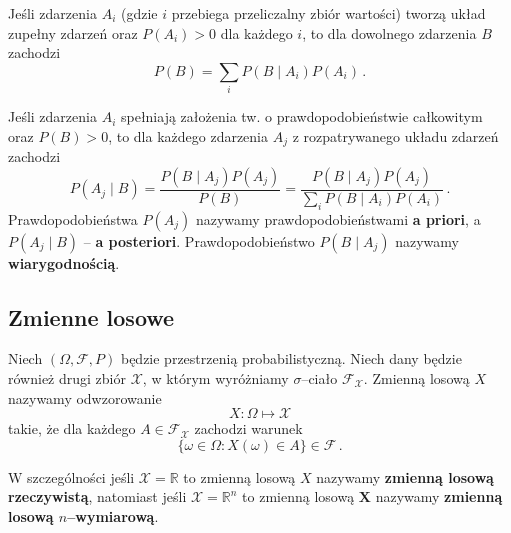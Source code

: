 \documentclass{myclass}
\numberwithin{equation}{section}
\begin{document}
\begin{theorem}
Jeśli zdarzenia \(A_i\) (gdzie \(i\) przebiega przeliczalny zbiór wartości) tworzą układ zupełny
zdarzeń oraz \(P(A_i) > 0\) dla każdego \(i\), to dla dowolnego zdarzenia \(B\) zachodzi
\begin{equation*}
    P(B) = \sum_{i} P(B \mid A_i) P(A_i)\,.
\end{equation*}
\end{theorem}

\begin{theorem}[Bayesa]
Jeśli zdarzenia \(A_i\) spełniają założenia tw. o prawdopodobieństwie całkowitym oraz \(P(B) > 0\),
to dla każdego zdarzenia \(A_j\) z rozpatrywanego układu zdarzeń zachodzi
\begin{equation*}
    P(A_j \mid B) = \frac{P(B \mid A_j) P(A_j)}{P(B)} = \frac{P(B \mid A_j) P(A_j)}{\sum_{i} P(B \mid A_i) P(A_i)}\,.
\end{equation*}
Prawdopodobieństwa \(P(A_j)\) nazywamy prawdopodobieństwami \textbf{a priori}, a \(P(A_j \mid
B)\) -- \textbf{a posteriori}. Prawdopodobieństwo \(P(B \mid A_j)\) nazywamy
\textbf{wiarygodnością}.   
\end{theorem}


\subsection{Zmienne losowe}

\begin{definition}
Niech \((\Omega, \mathcal{F}, P)\) będzie przestrzenią probabilistyczną. Niech dany będzie również
drugi zbiór \(\mathcal{X}\), w którym wyróżniamy \(\sigma\)--ciało \(\mathcal{F}_\mathcal{X}\).
Zmienną losową \(X\) nazywamy odwzorowanie
\begin{equation*}
    X: \Omega \mapsto \mathcal{X}
\end{equation*}
takie, że dla każdego \(A \in \mathcal{F}_\mathcal{X}\) zachodzi warunek
\begin{equation*}
    \{\omega \in \Omega : X(\omega) \in A \} \in \mathcal{F}\,.
\end{equation*}
\end{definition}

W szczególności jeśli \(\mathcal{X} = \mathbb{R}\) to zmienną losową \(X\) nazywamy
\textbf{zmienną losową rzeczywistą}, natomiast jeśli \(\mathcal{X} = \mathbb{R}^n\) to zmienną
losową \(\mathbf{X}\) nazywamy \textbf{zmienną losową \(n\)--wymiarową}.
\end{document}
